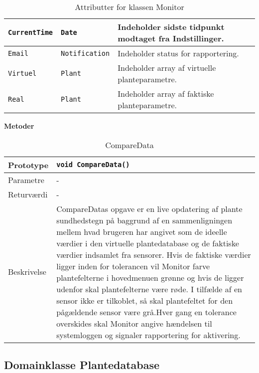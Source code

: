 \begin{table}[h]
\begin{tabularx}{\textwidth}{| >{\raggedright\arraybackslash}X | >{\raggedright\arraybackslash}X | >{\raggedright\arraybackslash}p{10 cm} |} \hline
\texttt{CurrentTime} & \texttt{Date} & Indeholder sidste tidpunkt modtaget fra Indstillinger. \\\hline
\texttt{Email} & \texttt{Notification} & Indeholder status for rapportering. \\\hline
\texttt{Virtuel} & \texttt{Plant} & Indeholder array af virtuelle planteparametre. \\\hline
\texttt{Real} & \texttt{Plant} & Indeholder array af faktiske planteparametre. \\\hline
\end{tabularx}
\caption{Attributter for klassen Monitor}
\label{table:Monitor_attributter}
\end{table}

\textbf{Metoder}

\begin{table}[h]
\begin{tabularx}{\textwidth}{| >{\raggedright\arraybackslash}p{2.5 cm} | >{\raggedright\arraybackslash}X |} \hline
Prototype & \texttt{void CompareData()} \\\hline
Parametre & - \\\hline
Returværdi & - \\\hline
Beskrivelse & CompareDatas opgave er en live opdatering af plante sundhedstegn på baggrund af en sammenligningen mellem hvad brugeren har angivet som de ideelle værdier i den virtuelle plantedatabase og de faktiske værdier indsamlet fra sensorer. Hvis de faktiske værdier ligger inden for tolerancen vil Monitor farve plantefelterne i hovedmenuen grønne og hvis de ligger udenfor skal plantefelterne være røde. I tilfælde af en sensor ikke er tilkoblet, så skal plantefeltet for den pågældende sensor være grå.Hver gang en tolerance overskides skal Monitor angive hændelsen til systemloggen og signaler rapportering for aktivering. \\\hline
\end{tabularx}
\caption{CompareData}
\label{table:CompareData}
\end{table}

\clearpage

\subsection{Domainklasse Plantedatabase}

